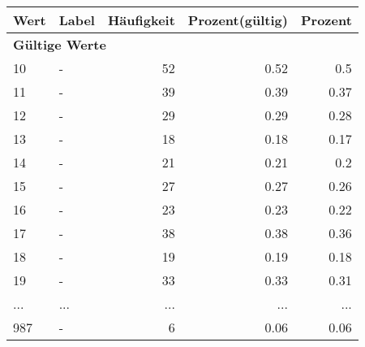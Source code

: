      \begin{longtable}{lXrrr}
     \toprule
     \textbf{Wert} & \textbf{Label} & \textbf{Häufigkeit} & \textbf{Prozent(gültig)} & \textbf{Prozent} \\
     \endhead
     \midrule
     \multicolumn{5}{l}{\textbf{Gültige Werte}}\\
        10 & \multicolumn{1}{X}{-} & %
          \num{52} &
          \num[round-mode=places,round-precision=2]{0,52} &
          \num[round-mode=places,round-precision=2]{0,5} \\
        11 & \multicolumn{1}{X}{-} & %
          \num{39} &
          \num[round-mode=places,round-precision=2]{0,39} &
          \num[round-mode=places,round-precision=2]{0,37} \\
        12 & \multicolumn{1}{X}{-} & %
          \num{29} &
          \num[round-mode=places,round-precision=2]{0,29} &
          \num[round-mode=places,round-precision=2]{0,28} \\
        13 & \multicolumn{1}{X}{-} & %
          \num{18} &
          \num[round-mode=places,round-precision=2]{0,18} &
          \num[round-mode=places,round-precision=2]{0,17} \\
        14 & \multicolumn{1}{X}{-} & %
          \num{21} &
          \num[round-mode=places,round-precision=2]{0,21} &
          \num[round-mode=places,round-precision=2]{0,2} \\
        15 & \multicolumn{1}{X}{-} & %
          \num{27} &
          \num[round-mode=places,round-precision=2]{0,27} &
          \num[round-mode=places,round-precision=2]{0,26} \\
        16 & \multicolumn{1}{X}{-} & %
          \num{23} &
          \num[round-mode=places,round-precision=2]{0,23} &
          \num[round-mode=places,round-precision=2]{0,22} \\
        17 & \multicolumn{1}{X}{-} & %
          \num{38} &
          \num[round-mode=places,round-precision=2]{0,38} &
          \num[round-mode=places,round-precision=2]{0,36} \\
        18 & \multicolumn{1}{X}{-} & %
          \num{19} &
          \num[round-mode=places,round-precision=2]{0,19} &
          \num[round-mode=places,round-precision=2]{0,18} \\
        19 & \multicolumn{1}{X}{-} & %
          \num{33} &
          \num[round-mode=places,round-precision=2]{0,33} &
          \num[round-mode=places,round-precision=2]{0,31} \\
       ... & ... & ... & ... & ... \\
        987 & \multicolumn{1}{X}{-} & %
          \num{6} &
          \num[round-mode=places,round-precision=2]{0,06} &
          \num[round-mode=places,round-precision=2]{0,06} \\


\end{longtable}
